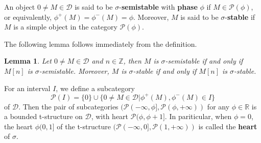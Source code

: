 \documentclass[a4paper,12pt]{amsart}
\newtheorem{lemma}[theorem]{Lemma}
\begin{document}
An object $0\neq M\in\mathcal{D}$ is said to be $\sigma$-\textbf{semistable} with \textbf{phase} $\phi$ if $M\in\mathcal{P}(\phi)$, or equivalently, $\phi^+(M)=\phi^-(M)=\phi$. Moreover, $M$ is said to be $\sigma$-\textbf{stable} if $M$ is a simple object in the category $\mathcal{P}(\phi)$.

The following lemma follows immediately from the definition.
\begin{lemma}\label{stability under shift}
    Let $0\neq M\in\mathcal{D}$ and $n\in\mathbb{Z}$, then $M$ is $\sigma$-semistable if and only if $M[n]$ is $\sigma$-semistable. Moreover, $M$ is $\sigma$-stable if and only if $M[n]$ is $\sigma$-stable.
\end{lemma}


For an interval $I$, we define a subcategory 
\[\mathcal{P}(I)=\{0\}\cup\{0\neq M\in\mathcal{D}|\phi^+(M),\phi^-(M)\in I\}\]
of $\mathcal{D}$. Then the pair of subcategories $(\mathcal{P}(-\infty,\phi],\mathcal{P}(\phi,+\infty))$ for any $\phi\in\mathbb{R}$ is a bounded t-structure on $\mathcal{D}$, with heart $\mathcal{P}(\phi,\phi+1]$. In pariticular, when $\phi=0$, the heart $\phi(0,1]$ of the t-structure $(\mathcal{P}(-\infty,0],\mathcal{P}(1,+\infty))$ is called the \textbf{heart} of $\sigma$.
\end{document}

